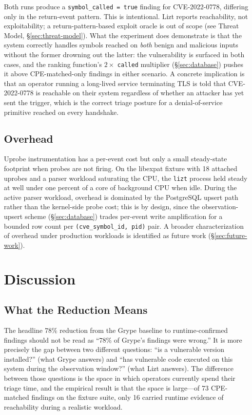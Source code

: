 \documentclass[conference]{IEEEtran}
\begin{document}
Both runs produce a \texttt{symbol\_called~=~true} finding for CVE-2022-0778, differing only in the return-event pattern.
This is intentional.
Lizt reports reachability, not exploitability; a return-pattern-based exploit oracle is out of scope (see Threat Model, \S\ref{sec:threat-model}).
What the experiment does demonstrate is that the system correctly handles symbols reached on \emph{both} benign and malicious inputs without the former drowning out the latter: the vulnerability is surfaced in both cases, and the ranking function's $2\times$ \texttt{called} multiplier (\S\ref{sec:database}) pushes it above CPE-matched-only findings in either scenario.
A concrete implication is that an operator running a long-lived service terminating TLS is told that CVE-2022-0778 is reachable on their system regardless of whether an attacker has yet sent the trigger, which is the correct triage posture for a denial-of-service primitive reached on every handshake.

\subsection{Overhead}

Uprobe instrumentation has a per-event cost but only a small steady-state footprint when probes are not firing.
On the libexpat fixture with 18 attached uprobes and a parser workload saturating the CPU, the \texttt{lizt} process held steady at well under one percent of a core of background CPU when idle.
During the active parser workload, overhead is dominated by the PostgreSQL upsert path rather than the kernel-side probe cost; this is by design, since the observation-upsert scheme (\S\ref{sec:database}) trades per-event write amplification for a bounded row count per \texttt{(cve\_symbol\_id, pid)} pair.
A broader characterization of overhead under production workloads is identified as future work (\S\ref{sec:future-work}).


\section{Discussion}

\subsection{What the Reduction Means}

The headline 78\% reduction from the Grype baseline to runtime-confirmed findings should not be read as ``78\% of Grype's findings were wrong.''
It is more precisely the gap between two different questions: ``is a vulnerable version installed?''
(what Grype answers) and ``has vulnerable code executed on this system during the observation window?''
(what Lizt answers).
The difference between those questions is the space in which operators currently spend their triage time, and the empirical result is that the space is large---of 73 CPE-matched findings on the fixture suite, only 16 carried runtime evidence of reachability during a realistic workload.
\end{document}
